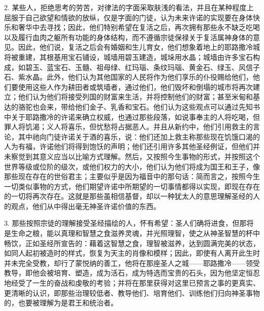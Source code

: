 2. 某些人，拒绝思考的劳苦，对律法的字面采取肤浅的看法，并且在某种程度上屈服于自己欲望和情欲的放纵，仅是字面的门徒，认为未来许诺的实现要在身体快乐和奢华中去寻找；因此，他们特别希望在复活之后，再次拥有那些永不缺乏吃喝以及履行血肉之躯所有功能的身体结构，而不遵循宗徒保禄关于复活属神身体的意见。因此，他们说，复活之后会有婚姻和生儿育女，他们想象着地上的耶路撒冷城将被重建，其根基用宝石铺设，城墙用碧玉建造，城垛用水晶；城墙由许多宝石构成，如碧玉、蓝宝石、玉髓、祖母绿、红玛瑙、条纹玛瑙、黄金石、绿玉、风信子石、紫水晶。此外，他们认为其他国家的人民将作为他们享乐的仆役赐给他们，他们要使用这些人作为耕田者或筑墙者，通过他们，他们毁坏和倒塌的城市将再次建立；他们认为他们将接受列国的财富来生活，并将控制他们的财富；甚至米甸和基达的骆驼也会来，带给他们金子、乳香和宝石。他们认为这些观点可以通过先知书中关于耶路撒冷的许诺来确立权威，也通过那些段落，如说事奉主的人将吃喝，但罪人将饥渴；义人将喜乐，但忧愁将占据恶人。并且从新约中，他们引用救主的言论，其中祂向门徒许诺关于酒的喜乐，说：他们还加上救主称那些现在饥饿口渴的人为有福，许诺他们将得到饱饫的声明；他们还引用许多其他圣经例证，但他们并未察觉到其意义应当以比喻方式理解。然后，又按照今生事物的形式，并按照这个世界等级或位阶的级次，或他们权力的大小，他们认为他们将成为国王和王子，像那些现在存在的世俗君主；主要似乎是因为福音中的那句话：简而言之，按照今生一切类似事物的方式，他们期望许诺中所期望的一切事情都得以实现，即现在存在的一切将再次存在。这就是那些虽相信基督，却以一种犹太人的意思理解圣经的人的观点，他们从中得出毫无神圣许诺价值的东西。\par

3. 那些按照宗徒的理解接受圣经描绘的人，怀有希望：圣人们确将进食，但那将是生命之粮，能以真理和智慧之食滋养灵魂，并光照理智，使之从神圣智慧的杯中畅饮，正如圣经所宣告的：藉着这智慧之食，理智被滋养，达到圆满完美的状态，如同人起初被造时的样式，恢复为天主的肖像和模样；因此，即使有人离开此生时并未完全受教，却行了蒙悦纳的善工，他将在那座圣人之城——耶路撒冷——领受教导，即他会被培育、塑造，成为活石，成为特选而宝贵的石头，因为他坚定恒忍地经受了一生的奋战和虔敬的考验；并将在那里获得对这里已预言之事的更真实、更清晰的认识，即那些治理较低者、教导他们、培育他们、训练他们归向神圣事物的，也要被理解为是君王和统治者。\par

